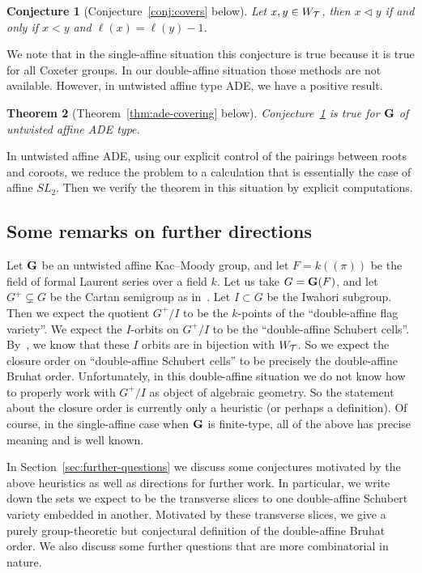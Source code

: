 \documentclass[10pt]{amsart}
\newtheorem{theo}{Theorem}[section]
\newtheorem{conj}[theo]{Conjecture}
\begin{document}
\begin{conj}[Conjecture~\ref{conj:covers} below]\label{conj:covering-conjecture}
Let $x,y \in W_{\mathcal{T}}$, then $x \lhd y$ if and only if $x < y$ and $\ell(x) = \ell(y) - 1$.
\end{conj}

We note that in the single-affine situation this conjecture is true because it is true for all Coxeter groups. In our double-affine situation those methods are not available. However, in untwisted affine type ADE, we have a positive result.

\begin{theo}[Theorem~\ref{thm:ade-covering} below]
Conjecture~\ref{conj:covering-conjecture} is true for $\mathbf{G}$ of untwisted affine ADE type.
\end{theo}

In untwisted affine ADE, using our explicit control of the pairings between roots and coroots, we reduce the problem to a calculation that is essentially the case of affine $SL_2$. Then we verify the theorem in this situation by explicit computations.

\subsection{Some remarks on further directions}

Let $\mathbf{G}$ be an untwisted affine Kac--Moody group, and let $F = k((\pi))$ be the field of formal Laurent series over a field $k$. Let us take $G = \mathbf{G}(F)$, and let $G^+ \subsetneq G$ be the Cartan semigroup as in~\cite{BKP}. Let $I \subset G$ be the Iwahori subgroup. Then we expect the quotient $G^+/I$ to be the $k$-points of the ``double-affine flag variety''. We expect the $I$-orbits on $G^+/I$ to be the ``double-affine Schubert cells''. By~\cite{BKP}, we know that these $I$ orbits are in bijection with $W_{\mathcal{T}}$. So we expect the closure order on ``double-affine Schubert cells'' to be precisely the double-affine Bruhat order. Unfortunately, in this double-affine situation we do not know how to properly work with $G^+/I$ as object of algebraic geometry. So the statement about the closure order is currently only a heuristic (or perhaps a definition). Of course, in the single-affine case when $\mathbf{G}$ is finite-type, all of the above has precise meaning and is well known.

In Section~\ref{sec:further-questions} we discuss some conjectures motivated by the above heuristics as well as directions for further work. In particular, we write down the sets we expect to be the transverse slices to one double-affine Schubert variety embedded in another. Motivated by these transverse slices, we give a purely group-theoretic but conjectural definition of the double-affine Bruhat order. We also discuss some further questions that are more combinatorial in nature.
\end{document}
